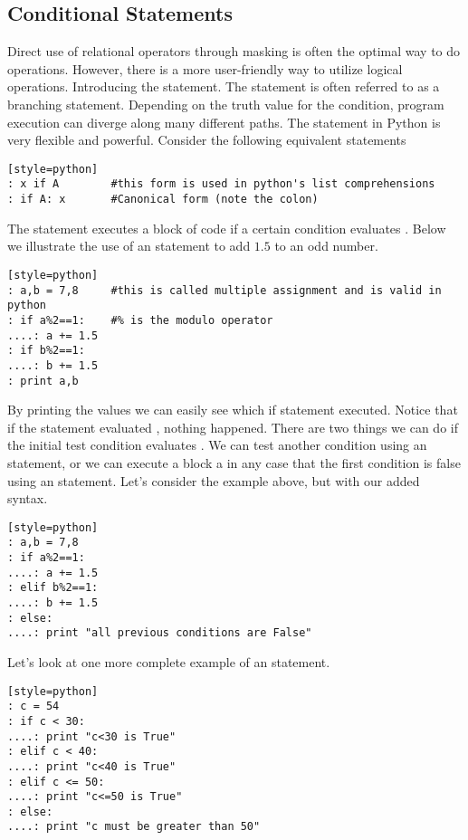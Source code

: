

\subsection*{Conditional Statements}
Direct use of relational operators through masking is often the optimal way to do operations. However, there is a more user-friendly way to utilize logical operations.  Introducing the  statement.  The  statement is often referred to as a branching statement.  Depending on the truth value for the condition, program execution can diverge along many different paths.  The  statement in Python is very flexible and powerful.  Consider the following equivalent statements
\begin{lstlisting}[style=python][style=python]
: x if A        #this form is used in python's list comprehensions
: if A: x       #Canonical form (note the colon)
\end{lstlisting}

The  statement executes a block of code if a certain condition evaluates .  Below we illustrate the use of an  statement to add $1.5$ to an odd number.
\begin{lstlisting}[style=python][style=python]
: a,b = 7,8     #this is called multiple assignment and is valid in python
: if a%2==1:    #% is the modulo operator
....: a += 1.5
: if b%2==1:
....: b += 1.5
: print a,b
\end{lstlisting}

By printing the values we can easily see which if statement executed.  Notice that if the  statement evaluated , nothing happened.  There are two things we can do if the initial test condition evaluates .  We can test another condition using an  statement, or we can execute a block a in any case that the first condition is false using an  statement.  Let's consider the example above, but with our added syntax.
\begin{lstlisting}[style=python][style=python]
: a,b = 7,8
: if a%2==1:
....: a += 1.5
: elif b%2==1:
....: b += 1.5
: else:
....: print "all previous conditions are False"
\end{lstlisting}

Let's look at one more complete example of an  statement.  
\begin{lstlisting}[style=python][style=python]
: c = 54
: if c < 30:
....: print "c<30 is True"
: elif c < 40:
....: print "c<40 is True"
: elif c <= 50:
....: print "c<=50 is True"
: else:
....: print "c must be greater than 50"
\end{lstlisting}

